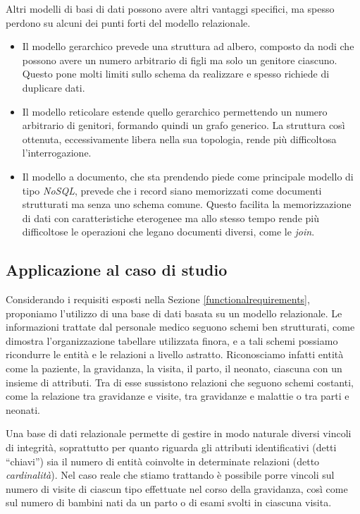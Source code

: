 Altri modelli di basi di dati possono avere altri vantaggi specifici, ma spesso perdono su alcuni dei punti forti del modello relazionale.
\begin{itemize}
\item Il modello gerarchico prevede una struttura ad albero, composto da nodi che possono avere un numero arbitrario di figli ma solo un genitore ciascuno. Questo pone molti limiti sullo schema da realizzare e spesso richiede di duplicare dati.
\item Il modello reticolare estende quello gerarchico permettendo un numero arbitrario di genitori, formando quindi un grafo generico. La struttura così ottenuta, eccessivamente libera nella sua topologia, rende più difficoltosa l'interrogazione.
\item Il modello a documento, che sta prendendo piede come principale modello di tipo \emph{NoSQL}, prevede che i record siano memorizzati come documenti strutturati ma senza uno schema comune. Questo facilita la memorizzazione di dati con caratteristiche eterogenee ma allo stesso tempo rende più difficoltose le operazioni che legano documenti diversi, come le \emph{join}.
\end{itemize}

\subsection{Applicazione al caso di studio}

Considerando i requisiti esposti nella Sezione \ref{functionalrequirements}, proponiamo l'utilizzo di una base di dati basata su un modello relazionale.
Le informazioni trattate dal personale medico seguono schemi ben strutturati, come dimostra l'organizzazione tabellare utilizzata finora, e a tali schemi possiamo ricondurre le entità e le relazioni a livello astratto.
Riconosciamo infatti entità come la paziente, la gravidanza, la visita, il parto, il neonato, ciascuna con un insieme di attributi.
Tra di esse sussistono relazioni che seguono schemi costanti, come la relazione tra gravidanze e visite, tra gravidanze e malattie o tra parti e neonati.

Una base di dati relazionale permette di gestire in modo naturale diversi vincoli di integrità, soprattutto per quanto riguarda gli attributi identificativi (detti \enquote{chiavi}) sia il numero di entità coinvolte in determinate relazioni (detto \emph{cardinalità}).
Nel caso reale che stiamo trattando è possibile porre vincoli sul numero di visite di ciascun tipo effettuate nel corso della gravidanza, così come sul numero di bambini nati da un parto o di esami svolti in ciascuna visita.

